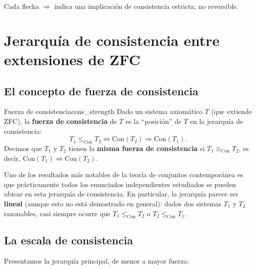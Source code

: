 Cada flecha $\Rightarrow$ indica una implicación de consistencia estricta, no reversible.

\section{Jerarquía de consistencia entre extensiones de ZFC}

\subsection{El concepto de fuerza de consistencia}

\begin{definicion}{Fuerza de consistencia}{cons_strength}
Dado un sistema axiomático $T$ (que extiende ZFC), la \textbf{fuerza de consistencia} de $T$ es la ``posición'' de $T$ en la jerarquía de consistencia:
\[
  T_1 \leq_{\mathrm{Con}} T_2 \iff \mathrm{Con}(T_2) \Rightarrow \mathrm{Con}(T_1).
\]
Decimos que $T_1$ y $T_2$ tienen la \textbf{misma fuerza de consistencia} si $T_1 \equiv_{\mathrm{Con}} T_2$, es decir, $\mathrm{Con}(T_1) \iff \mathrm{Con}(T_2)$.
\end{definicion}

\begin{importante}
Uno de los resultados más notables de la teoría de conjuntos contemporánea es que prácticamente todos los enunciados independientes estudiados se pueden ubicar en esta jerarquía de consistencia. En particular, la jerarquía parece ser \textbf{lineal} (aunque esto no está demostrado en general): dados dos sistemas $T_1$ y $T_2$ razonables, casi siempre ocurre que $T_1 \leq_{\mathrm{Con}} T_2$ o $T_2 \leq_{\mathrm{Con}} T_1$.
\end{importante}

\subsection{La escala de consistencia}

Presentamos la jerarquía principal, de menor a mayor fuerza:


